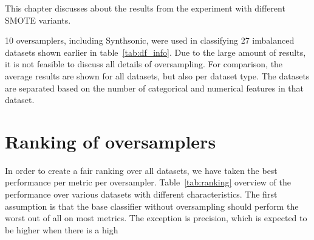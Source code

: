 
This chapter discusses about the results from the experiment with different SMOTE variants. 

10 oversamplers, including Synthsonic, were used in classifying 27 imbalanced datasets shown earlier in table~\ref{tab:df_info}. Due to the large amount of results, it is not feasible to discuss all details of oversampling. For comparison, the average results are shown for all datasets, but also per dataset type. The datasets are separated based on the number of categorical and numerical features in that dataset.

\section{Ranking of oversamplers}
In order to create a fair ranking over all datasets, we have taken the best performance per metric per oversampler. Table~\ref{tab:ranking} overview of the performance over various datasets with different characteristics. The first assumption is that the base classifier without oversampling should perform the worst out of all on most metrics. The exception is precision, which is expected to be higher when there is a high 

